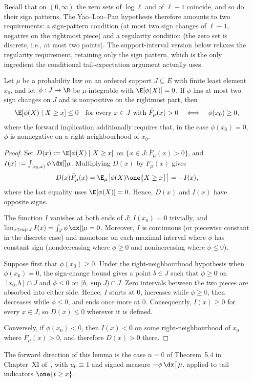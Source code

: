 \documentclass[11pt]{article}
\begin{document}
Recall that on $(0,\infty)$ the zero sets of \(\log\ell\) and of \(\ell-1\) coincide, and so do their sign patterns. The Yao--Lou--Pan hypothesis therefore amounts to two requirements: a sign-pattern condition (at most two sign changes of \(\ell-1\), negative on the rightmost piece) and a regularity condition (the zero set is discrete, i.e., at most two points). The support-interval version below relaxes the regularity requirement, retaining only the sign pattern, which is the only ingredient the conditional tail-expectation argument actually uses.%


\begin{lem}
\label{lem:tail-mean-sign}
Let $\mu$ be a probability law on an ordered support $J \subseteq E$ with finite least element $x_0$, and let $\phi:J\to\R$ be $\mu$-integrable with $\E[\phi(X)]=0$. If $\phi$ has at most two sign changes on $J$ and is nonpositive on the rightmost part, then
\[
\E[\phi(X)\mid X\ge x]\le 0 \quad\text{for every }x\in J\text{ with }\bar F_\mu(x)>0 \quad\Longleftrightarrow\quad \phi(x_0)\ge 0,
\]
where the forward implication additionally requires that, in the case $\phi(x_0)=0$, $\phi$ is nonnegative on a right-neighbourhood of $x_0$.
\end{lem}
\begin{proof}
Set $D(x):=\E[\phi(X)\mid X\ge x]$ on $\{x\in J:\bar F_\mu(x)>0\}$, and $I(x):=\int_{[x_0,x)}\phi\,\dx[]\mu$. Multiplying $D(x)$ by $\bar F_\mu(x)$ gives
\[
D(x)\bar F_\mu(x) =\E_\mu\bigl[\phi(X)\one\{X\ge x\}\bigr] =-I(x),
\]
where the last equality uses $\E[\phi(X)]=0$. Hence, $D(x)$ and $I(x)$ have opposite signs.

The function $I$ vanishes at both ends of $J$: $I(x_0)=0$ trivially, and $\lim_{x\uparrow\sup J}I(x)=\int_J\phi\,\dx[]\mu=0$. Moreover, $I$ is continuous (or piecewise constant in the discrete case) and monotone on each maximal interval where $\phi$ has constant sign (nondecreasing where $\phi\ge 0$ and nonincreasing where $\phi\le 0$). 

Suppose first that \(\phi(x_0)\ge 0\). Under the right-neighbourhood hypothesis when \(\phi(x_0)=0\), the sign-change bound gives a point \(b\in J\) such that \(\phi\ge 0\) on \([x_0,b]\cap J\) and \(\phi\le 0\) on \([b,\sup J)\cap J\). Zero intervals between the two pieces are absorbed into either side. Hence, $I$ starts at $0$, increases while $\phi\ge 0$, then decreases while $\phi\le 0$, and ends once more at $0$. Consequently, $I(x)\ge 0$ for every $x\in J$, so $D(x)\le 0$ wherever it is defined.

Conversely, if $\phi(x_0)<0$, then $I(x)<0$ on some right-neighbourhood of $x_0$ where $\bar F_\mu(x)>0$, and therefore $D(x)>0$ there.
\end{proof}
\begin{rem}
The forward direction of this lemma is the case \(n=0\) of Theorem~5.4 in Chapter~XI of~\cite{KarlinStudden1966}, with \(u_0\equiv 1\) and signed measure \(-\phi\,\dx[]\mu\), applied to tail indicators \(\one\{t\ge x\}\).
\end{rem}
\end{document}
